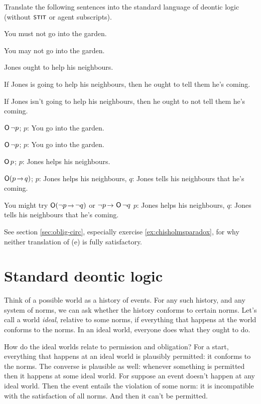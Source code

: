 \begin{exercise}\label{ex:translate-sdl}
  Translate the following sentences into the standard language of deontic logic (without $\stit$ or agent subscripts).
  \begin{exlist}
  \item You must not go into the garden.
  \item You may not go into the garden.
  \item Jones ought to help his neighbours.
  \item If Jones is going to help his neighbours, then he ought to tell them
    he's coming.
  \item If Jones isn't going to help his neighbours, then he ought to not tell
    them he's coming.
  \end{exlist}
\end{exercise}
\begin{solution}
  \begin{sollist}
    \item $\operatorname{\mathsf{O}} \neg p$; \quad $p$: You go into the garden.
    \item $\operatorname{\mathsf{O}} \neg p$; \quad $p$: You go into the garden.
    \item $\operatorname{\mathsf{O}} p$; \quad $p$: Jones helps his neighbours.
    \item $\Ob (p \to q)$; \quad $p$: Jones helps his
    neighbours, $q$: Jones tells his neighbours that he's coming.
    \item You might try $\Ob (\neg p \to \neg q)$ or $\neg p \to \Ob \neg q$ \quad $p$: Jones helps his neighbours, $q$: Jones tells his neighbours that he's coming.
  \end{sollist}
  See section \ref{sec:oblig-circ}, especially exercise \ref{ex:chisholmsparadox},
  for why neither translation of (e) is fully satisfactory.
\end{solution}


\section{Standard deontic logic}

Think of a possible world as a history of events. For any such history, and any
system of norms, we can ask whether the history conforms to certain norms. Let's
call a world \emph{ideal}, relative to some norms, if everything that happens at
the world conforms to the norms. In an ideal world, everyone does what they
ought to do.

How do the ideal worlds relate to permission and obligation? For a start,
everything that happens at an ideal world is plausibly permitted: it conforms to
the norms. The converse is plausible as well: whenever something is permitted
then it happens at some ideal world. For suppose an event doesn't happen at any
ideal world. Then the event entails the violation of some norm: it is
incompatible with the satisfaction of all norms. And then it can't be permitted.

